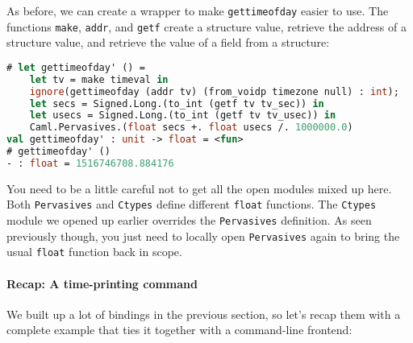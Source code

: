 As before, we can create a wrapper to make
\passthrough{\lstinline!gettimeofday!} easier to use. The functions
\passthrough{\lstinline!make!}, \passthrough{\lstinline!addr!}, and
\passthrough{\lstinline!getf!} create a structure value, retrieve the
address of a structure value, and retrieve the value of a field from a
structure:

\begin{lstlisting}[language=Caml]
# let gettimeofday' () =
    let tv = make timeval in
    ignore(gettimeofday (addr tv) (from_voidp timezone null) : int);
    let secs = Signed.Long.(to_int (getf tv tv_sec)) in
    let usecs = Signed.Long.(to_int (getf tv tv_usec)) in
    Caml.Pervasives.(float secs +. float usecs /. 1000000.0)
val gettimeofday' : unit -> float = <fun>
# gettimeofday' ()
- : float = 1516746708.884176
\end{lstlisting}

You need to be a little careful not to get all the open modules mixed up
here. Both \passthrough{\lstinline!Pervasives!} and
\passthrough{\lstinline!Ctypes!} define different
\passthrough{\lstinline!float!} functions. The
\passthrough{\lstinline!Ctypes!} module we opened up earlier overrides
the \passthrough{\lstinline!Pervasives!} definition. As seen previously
though, you just need to locally open
\passthrough{\lstinline!Pervasives!} again to bring the usual
\passthrough{\lstinline!float!} function back in scope.

\hypertarget{recap-a-time-printing-command}{%
\paragraph{Recap: A time-printing
command}\label{recap-a-time-printing-command}}

We built up a lot of bindings in the previous section, so let's recap
them with a complete example that ties it together with a command-line
frontend: 

